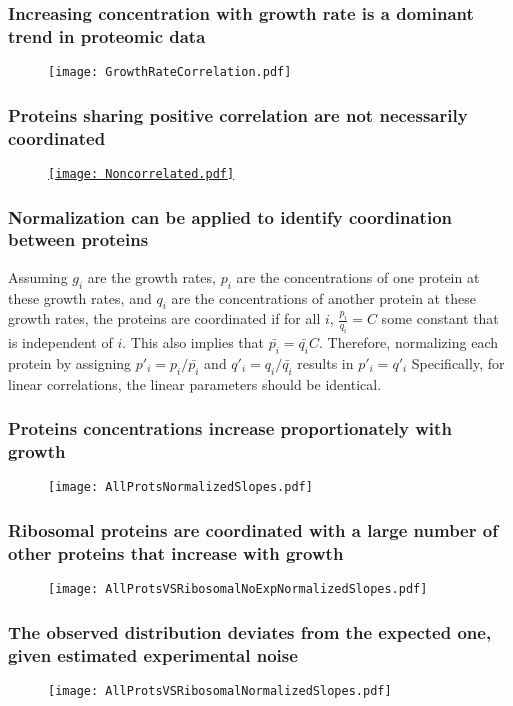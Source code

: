 \documentclass{beamer}
\begin{document}
\begin{frame}
\frametitle{Increasing concentration with growth rate is a dominant trend in proteomic data}
\begin{figure}[h!]
\centering
\texttt{[image: GrowthRateCorrelation.pdf]}
\end{figure}
\end{frame}

\begin{frame}
\frametitle{Proteins sharing positive correlation are not necessarily coordinated}
\begin{figure}[h!]
\centering
\href{https://plot.ly/~uri.barenholz/0/protein-concentration-vs-growth-rate/}
    {\texttt{[image: Noncorrelated.pdf]}}
\end{figure}
\end{frame}

\begin{frame}
\frametitle{Normalization can be applied to identify coordination between proteins}
Assuming $g_i$ are the growth rates, $p_i$ are the concentrations of one protein at these growth rates, and $q_i$ are the concentrations of another protein at these growth rates, the proteins are coordinated if for all $i$, $\frac{p_i}{q_i}=C$ some constant that is independent of $i$.
This also implies that $\bar{p_i}=\bar{q_i}C$.
Therefore, normalizing each protein by assigning $p'_i=p_i/\bar{p_i}$ and $q'_i=q_i/\bar{q_i}$ results in $p'_i=q'_i$
Specifically, for linear correlations, the linear parameters should be identical.
\end{frame}

\begin{frame}
\frametitle{Proteins concentrations increase proportionately with growth}
\begin{figure}[h!]
\centering
\texttt{[image: AllProtsNormalizedSlopes.pdf]}
\end{figure}
\end{frame}

\begin{frame}
\frametitle{Ribosomal proteins are coordinated with a large number of other proteins that increase with growth}
\begin{figure}[h!]
\centering
\texttt{[image: AllProtsVSRibosomalNoExpNormalizedSlopes.pdf]}
\end{figure}
\end{frame}

\begin{frame}
\frametitle{The observed distribution deviates from the expected one, given estimated experimental noise}
\begin{figure}[h!]
\centering
\texttt{[image: AllProtsVSRibosomalNormalizedSlopes.pdf]}
\end{figure}
\end{frame}
\end{document}
